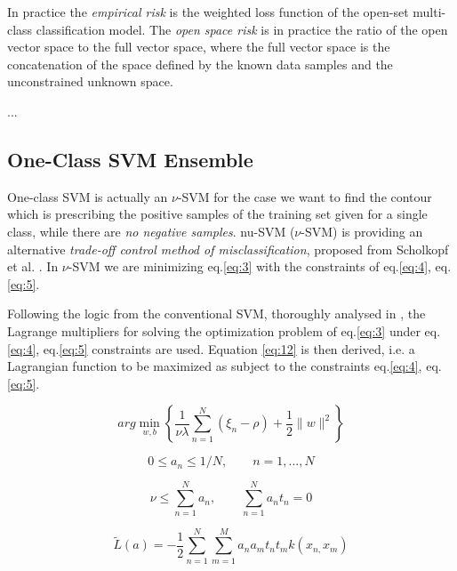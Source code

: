 In practice the \textit{empirical risk} is the weighted loss function of the open-set multi-class classification model. The \textit{open space risk} is in practice the ratio of the open vector space to the full vector space, where the full vector space is the concatenation of the space defined by the known data samples and the unconstrained unknown space.


...



\subsection{One-Class SVM Ensemble}\label{chap:openset:sec:OCSVM_description}

One-class SVM is actually an $\nu$-SVM for the case we want to find the contour which is prescribing the positive samples of the training set given for a single class, while there are \textit{no negative samples}. nu-SVM ($\nu$-SVM) is providing an alternative \textit{trade-off control method of misclassification}, proposed from Scholkopf et al. . In $\nu$-SVM we are minimizing eq.\ref{eq:3} with the constraints of eq.\ref{eq:4}, eq.\ref{eq:5}.

Following the logic from the conventional SVM, thoroughly analysed in , the Lagrange multipliers for solving the optimization problem of eq.\ref{eq:3} under eq.\ref{eq:4}, eq.\ref{eq:5} constraints are used. Equation \ref{eq:12} is then derived, i.e. a Lagrangian function to be maximized as subject to the constraints eq.\ref{eq:4}, eq.\ref{eq:5}.

\begin{equation}\label{eq:3}
	arg\min_{w,b}\left\{ \frac{1}{\nu\lambda}\sum_{n=1}^{N}(\xi_{n}-\rho)+\frac{1}{2}\|w\|^{2}\right\}
\end{equation}

\begin{equation}\label{eq:4}
	0\leqslant a_{n}\leqslant1/N,\qquad n=1,...,N
\end{equation}

\begin{equation}\label{eq:5}
	\nu\leqslant\sum_{n=1}^{N}a_{n}, \qquad \sum_{n=1}^{N}a_{n}t_{n}=0
\end{equation}

\begin{equation}\label{eq:12}
	\widetilde{L}(a)=-\frac{1}{2}\sum_{n=1}^{N}\sum_{m=1}^{M}a_{n}a_{m}t_{n}t_{m}k(x_{n,}x_{m})
\end{equation}

